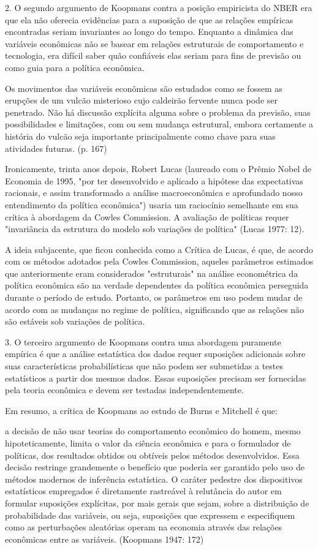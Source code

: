 \documentclass[12pt]{article}
\begin{document}
2. O segundo argumento de Koopmans contra a posição empiricista do NBER era que ela não oferecia evidências para a suposição de que as relações empíricas encontradas seriam invariantes ao longo do tempo. Enquanto a dinâmica das variáveis econômicas não se basear em relações estruturais de comportamento e tecnologia, era difícil saber quão confiáveis elas seriam para fins de previsão ou como guia para a política econômica.

Os movimentos das variáveis econômicas são estudados como se fossem as erupções de um vulcão misterioso cujo caldeirão fervente nunca pode ser penetrado. Não há discussão explícita alguma sobre o problema da previsão, suas possibilidades e limitações, com ou sem mudança estrutural, embora certamente a história do vulcão seja importante principalmente como chave para suas atividades futuras. (p. 167)

Ironicamente, trinta anos depois, Robert Lucas (laureado com o Prêmio Nobel de Economia de 1995, "por ter desenvolvido e aplicado a hipótese das expectativas racionais, e assim transformado a análise macroeconômica e aprofundado nosso entendimento da política econômica") usaria um raciocínio semelhante em sua crítica à abordagem da Cowles Commission. A avaliação de políticas requer "invariância da estrutura do modelo sob variações de política" (Lucas 1977: 12).

A ideia subjacente, que ficou conhecida como a Crítica de Lucas, é que, de acordo com os métodos adotados pela Cowles Commission, aqueles parâmetros estimados que anteriormente eram considerados "estruturais" na análise econométrica da política econômica são na verdade dependentes da política econômica perseguida durante o período de estudo. Portanto, os parâmetros em uso podem mudar de acordo com as mudanças no regime de política, significando que as relações não são estáveis sob variações de política.

3. O terceiro argumento de Koopmans contra uma abordagem puramente empírica é que a análise estatística dos dados requer suposições adicionais sobre suas características probabilísticas que não podem ser submetidas a testes estatísticos a partir dos mesmos dados. Essas suposições precisam ser fornecidas pela teoria econômica e devem ser testadas independentemente.

Em resumo, a crítica de Koopmans ao estudo de Burns e Mitchell é que:

a decisão de não usar teorias do comportamento econômico do homem, mesmo hipoteticamente, limita o valor da ciência econômica e para o formulador de políticas, dos resultados obtidos ou obtíveis pelos métodos desenvolvidos. Essa decisão restringe grandemente o benefício que poderia ser garantido pelo uso de métodos modernos de inferência estatística. O caráter pedestre dos dispositivos estatísticos empregados é diretamente rastreável à relutância do autor em formular suposições explícitas, por mais gerais que sejam, sobre a distribuição de probabilidade das variáveis, ou seja, suposições que expressem e especifiquem como as perturbações aleatórias operam na economia através das relações econômicas entre as variáveis. (Koopmans 1947: 172)
\end{document}
